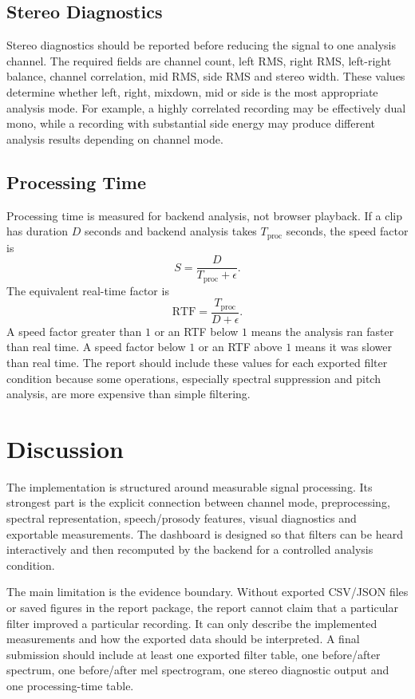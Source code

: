﻿\documentclass[11pt,a4paper]{article}
\begin{document}
\subsection{Stereo Diagnostics}
Stereo diagnostics should be reported before reducing the signal to one analysis channel. The required fields are channel count, left RMS, right RMS, left-right balance, channel correlation, mid RMS, side RMS and stereo width. These values determine whether left, right, mixdown, mid or side is the most appropriate analysis mode. For example, a highly correlated recording may be effectively dual mono, while a recording with substantial side energy may produce different analysis results depending on channel mode.

\subsection{Processing Time}
Processing time is measured for backend analysis, not browser playback. If a clip has duration $D$ seconds and backend analysis takes $T_{\mathrm{proc}}$ seconds, the speed factor is
\begin{equation}
    S = \frac{D}{T_{\mathrm{proc}}+\epsilon}.
\end{equation}
The equivalent real-time factor is
\begin{equation}
    \mathrm{RTF} = \frac{T_{\mathrm{proc}}}{D+\epsilon}.
\end{equation}
A speed factor greater than $1$ or an RTF below $1$ means the analysis ran faster than real time. A speed factor below $1$ or an RTF above $1$ means it was slower than real time. The report should include these values for each exported filter condition because some operations, especially spectral suppression and pitch analysis, are more expensive than simple filtering.

\section{Discussion}
The implementation is structured around measurable signal processing. Its strongest part is the explicit connection between channel mode, preprocessing, spectral representation, speech/prosody features, visual diagnostics and exportable measurements. The dashboard is designed so that filters can be heard interactively and then recomputed by the backend for a controlled analysis condition.

The main limitation is the evidence boundary. Without exported CSV/JSON files or saved figures in the report package, the report cannot claim that a particular filter improved a particular recording. It can only describe the implemented measurements and how the exported data should be interpreted. A final submission should include at least one exported filter table, one before/after spectrum, one before/after mel spectrogram, one stereo diagnostic output and one processing-time table.
\end{document}

